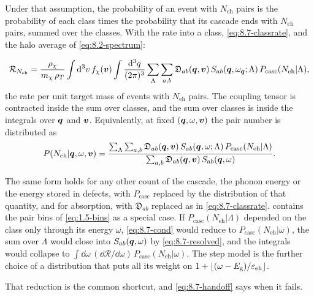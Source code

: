 Under that assumption, the probability of an event with $N_{\mathrm{eh}}$ pairs is the probability of each class times the probability that its cascade ends with $N_{\mathrm{eh}}$ pairs, summed over the classes. With the rate into a class, \cref{eq:8.7-classrate}, and the halo average of \cref{eq:8.2-spectrum}:
\begin{keyresult}
\begin{equation}
  \mathcal{R}_{N_{\mathrm{eh}}} = \frac{\rho_\chi}{m_{\chi}\,\rho_T}\int\mathrm{d}^3v\,f_\chi(\bm{v})\int\frac{\mathrm{d}^3q}{(2\pi)^3}\sum_\Lambda\sum_{a,b}\mathfrak{D}_{ab}(\bm{q},\bm{v})\,S_{ab}(\bm{q},\omega_{\bm{q}};\Lambda)\,P_{\mathrm{casc}}(N_{\mathrm{eh}}|\Lambda) ,
  \label{eq:8.7-handoff}
\end{equation}
the rate per unit target mass of events with $N_{\mathrm{eh}}$ pairs. The coupling tensor is contracted inside the sum over classes, and the sum over classes is inside the integrals over $\bm{q}$ and $\bm{v}$. Equivalently, at fixed $(\bm{q},\omega,\bm{v})$ the pair number is distributed as
\begin{equation}
  P(N_{\mathrm{eh}}|\bm{q},\omega,\bm{v}) = \frac{\sum_\Lambda\sum_{a,b}\mathfrak{D}_{ab}(\bm{q},\bm{v})\,S_{ab}(\bm{q},\omega;\Lambda)\,P_{\mathrm{casc}}(N_{\mathrm{eh}}|\Lambda)}{\sum_{a,b}\mathfrak{D}_{ab}(\bm{q},\bm{v})\,S_{ab}(\bm{q},\omega)} .
  \label{eq:8.7-cond}
\end{equation}
\end{keyresult}
\noindent The same form holds for any other count of the cascade, the phonon energy or the energy stored in defects, with $P_{\mathrm{casc}}$ replaced by the distribution of that quantity, and for absorption, with $\mathfrak{D}_{ab}$ replaced as in \cref{eq:8.7-classrate}.  contains the pair bins of \cref{eq:1.5-bins} as a special case. If $P_{\mathrm{casc}}(N_{\mathrm{eh}}|\Lambda)$ depended on the class only through its energy $\omega$, \cref{eq:8.7-cond} would reduce to $P_{\mathrm{casc}}(N_{\mathrm{eh}}|\omega)$, the sum over $\Lambda$ would close into $S_{ab}(\bm{q},\omega)$ by \cref{eq:8.7-resolved}, and the integrals would collapse to $\int\dd\omega\,(\dd\mathcal{R}/\dd\omega)\,P_{\mathrm{casc}}(N_{\mathrm{eh}}|\omega)$. The step model is the further choice of a distribution that puts all its weight on $1 + \lfloor(\omega - E_{\mathrm{g}})/\varepsilon_{\mathrm{eh}}\rfloor$.

That reduction is the common shortcut, and \cref{eq:8.7-handoff} says when it fails.

